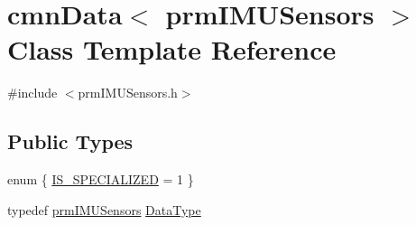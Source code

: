 \hypertarget{classcmn_data_3_01prm_i_m_u_sensors_01_4}{\section{cmn\-Data$<$ prm\-I\-M\-U\-Sensors $>$ Class Template Reference}
\label{classcmn_data_3_01prm_i_m_u_sensors_01_4}
}


{\ttfamily \#include $<$prm\-I\-M\-U\-Sensors.\-h$>$}

\subsection*{Public Types}
\begin{DoxyCompactItemize}
\item 
enum \{ \hyperlink{classcmn_data_3_01prm_i_m_u_sensors_01_4_ac4ac5f3e4893a70b605283eaa0bf9963af8531318500881478a0d7d07df8ffd21}{I\-S\-\_\-\-S\-P\-E\-C\-I\-A\-L\-I\-Z\-E\-D} = 1
 \}
\item 
typedef \hyperlink{classprm_i_m_u_sensors}{prm\-I\-M\-U\-Sensors} \hyperlink{classcmn_data_3_01prm_i_m_u_sensors_01_4_a194688d7b45dc5a5b01771de9484c432}{Data\-Type}
\end{DoxyCompactItemize}
